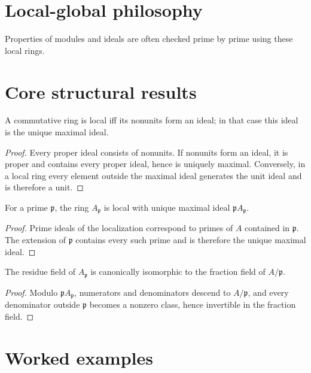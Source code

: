 \section{Local-global philosophy}
Properties of modules and ideals are often checked prime by prime using these local rings.

\section{Core structural results}

\begin{theorem}\label{thm:v08-01}
A commutative ring is local iff its nonunits form an ideal; in that case this ideal is the unique maximal ideal.
\begin{proof}
Every proper ideal consists of nonunits. If nonunits form an ideal, it is proper and contains every proper ideal, hence is uniquely maximal. Conversely, in a local ring every element outside the maximal ideal generates the unit ideal and is therefore a unit.
\end{proof}
\end{theorem}

\begin{theorem}\label{thm:v08-02}
For a prime $\mathfrak p$, the ring $A_{\mathfrak p}$ is local with unique maximal ideal $\mathfrak p A_{\mathfrak p}$.
\begin{proof}
Prime ideals of the localization correspond to primes of $A$ contained in $\mathfrak p$. The extension of $\mathfrak p$ contains every such prime and is therefore the unique maximal ideal.
\end{proof}
\end{theorem}

\begin{theorem}\label{thm:v08-03}
The residue field of $A_{\mathfrak p}$ is canonically isomorphic to the fraction field of $A/\mathfrak p$.
\begin{proof}
Modulo $\mathfrak p A_{\mathfrak p}$, numerators and denominators descend to $A/\mathfrak p$, and every denominator outside $\mathfrak p$ becomes a nonzero class, hence invertible in the fraction field.
\end{proof}
\end{theorem}

\section{Worked examples}

